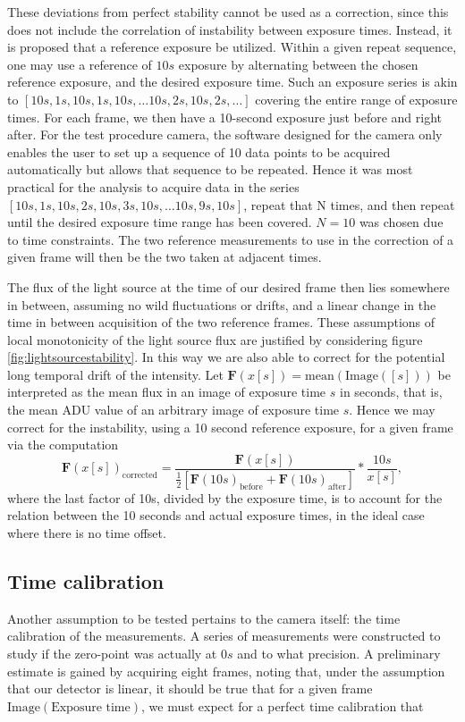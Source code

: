 \documentclass[../main.tex]{subfiles}
\begin{document}
		These deviations from perfect stability cannot be used as a correction, since this does not include the correlation of instability between exposure times. Instead, it is proposed that a reference exposure be utilized. Within a given repeat sequence, one may use a reference of $10s$ exposure by alternating between the chosen reference exposure, and the desired exposure time. Such an exposure series is akin to $[10s, 1s, 10s, 1s, 10s, \dots 10s, 2s, 10s, 2s,\dots]$ covering the entire range of exposure times. For each frame, we then have a 10-second exposure just before and right after. For the test procedure camera, the software designed for the camera only enables the user to set up a sequence of 10 data points to be acquired automatically but allows that sequence to be repeated. Hence it was most practical for the analysis to acquire data in the series $[10s, 1s, 10s, 2s, 10s, 3s, 10s, \dots 10s, 9s, 10s]$, repeat that N times, and then repeat until the desired exposure time range has been covered. $N=10$ was chosen due to time constraints. The two reference measurements to use in the correction of a given frame will then be the two taken at adjacent times. 
		
		The flux of the light source at the time of our desired frame then lies somewhere in between, assuming no wild fluctuations or drifts, and a linear change in the time in between acquisition of the two reference frames. These assumptions of local monotonicity of the light source flux are justified by considering figure \ref{fig:lightsourcestability}. In this way we are also able to correct for the potential long temporal drift of the intensity. Let $\bm F(x[s]) = \text{mean}\left(\text{Image}([s])\right)$ be interpreted as the mean flux in an image of exposure time $s$ in seconds, that is, the mean ADU value of an arbitrary image of exposure time $s$. Hence we may correct for the instability, using a 10 second reference exposure, for a given frame via the computation
		\begin{equation}\label{eq:fluxcorrect_notimecal}
			\bm F(x [s])_\text{corrected} = \frac{\bm F(x [s])}{\frac12\left[\bm F(10s)_\text{before}+\bm F(10s)_\text{after}\right]} * \frac{10s}{x[s]},
		\end{equation}
		where the last factor of 10s, divided by the exposure time, is to account for the relation between the 10 seconds and actual exposure times, in the ideal case where there is no time offset.
		
		\subsection{Time calibration}
	Another assumption to be tested pertains to the camera itself: the time calibration of the measurements. A series of measurements were constructed to study if the zero-point was actually at $0s$ and to what precision. A preliminary estimate is gained by acquiring eight frames, noting that, under the assumption that our detector is linear, it should be true that for a given frame $\text{Image}(\text{Exposure time})$, we must expect for a perfect time calibration that 
	
\end{document}
